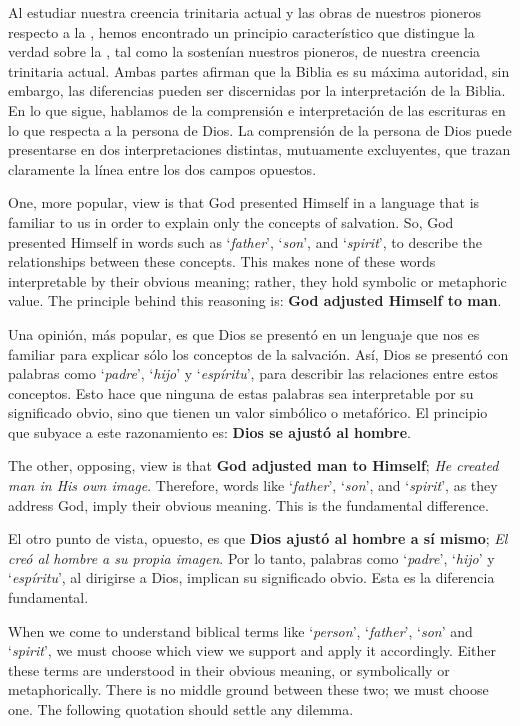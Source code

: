 Al estudiar nuestra creencia trinitaria actual y las obras de nuestros pioneros respecto a la , hemos encontrado un principio característico que distingue la verdad sobre la , tal como la sostenían nuestros pioneros, de nuestra creencia trinitaria actual. Ambas partes afirman que la Biblia es su máxima autoridad, sin embargo, las diferencias pueden ser discernidas por la interpretación de la Biblia. En lo que sigue, hablamos de la comprensión e interpretación de las escrituras en lo que respecta a la persona de Dios. La comprensión de la persona de Dios puede presentarse en dos interpretaciones distintas, mutuamente excluyentes, que trazan claramente la línea entre los dos campos opuestos.


One, more popular, view is that God presented Himself in a language that is familiar to us in order to explain only the concepts of salvation. So, God presented Himself in words such as ‘\textit{father}’, ‘\textit{son}’, and ‘\textit{spirit}’, to describe the relationships between these concepts. This makes none of these words interpretable by their obvious meaning; rather, they hold symbolic or metaphoric value. The principle behind this reasoning is: \textbf{God adjusted Himself to man}.


Una opinión, más popular, es que Dios se presentó en un lenguaje que nos es familiar para explicar sólo los conceptos de la salvación. Así, Dios se presentó con palabras como ‘\textit{padre}’, ‘\textit{hijo}’ y ‘\textit{espíritu}’, para describir las relaciones entre estos conceptos. Esto hace que ninguna de estas palabras sea interpretable por su significado obvio, sino que tienen un valor simbólico o metafórico. El principio que subyace a este razonamiento es: \textbf{Dios se ajustó al hombre}.


The other, opposing, view is that \textbf{God adjusted man to Himself}; \textit{He created man in His own image}. Therefore, words like ‘\textit{father}’, ‘\textit{son}’, and ‘\textit{spirit}’, as they address God, imply their obvious meaning. This is the fundamental difference.


El otro punto de vista, opuesto, es que \textbf{Dios ajustó al hombre a sí mismo}; \textit{El creó al hombre a su propia imagen}. Por lo tanto, palabras como ‘\textit{padre}’, ‘\textit{hijo}’ y ‘\textit{espíritu}’, al dirigirse a Dios, implican su significado obvio. Esta es la diferencia fundamental.


When we come to understand biblical terms like ‘\textit{person}’, ‘\textit{father}’, ‘\textit{son}’ and ‘\textit{spirit}’, we must choose which view we support and apply it accordingly. Either these terms are understood in their obvious meaning, or symbolically or metaphorically. There is no middle ground between these two; we must choose one. The following quotation should settle any dilemma.



